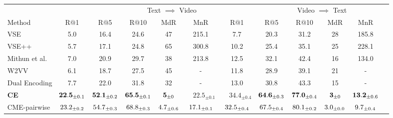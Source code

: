 \begin{table*}[t]
\centering 
\footnotesize 
\begin{tabular}{l | c | c c c c c |@{\hskip -0.2cm}c@{\hskip -0.35cm}c@{\hskip -0.35cm}c@{\hskip -0.1cm}c@{\hskip -0.2cm}c} 
\hline \hline
\multicolumn{2}{c}{} & 
\multicolumn{5}{c}{Text $\implies$ Video} & \multicolumn{5}{c}{Video $\implies$ Text} \\
Method  & R$@$1 & R$@$5 & R$@$10 & MdR & MnR & R$@$1 & R$@$5 & R$@$10 & MdR & MnR \\ 
\hline 
\hline 
VSE  & 5.0 & 16.4 & 24.6 & 47 & 215.1 & 7.7 & 20.3 & 31.2 & 28 & 185.8\\
VSE++ & 5.7 & 17.1 & 24.8 & 65 & 300.8 & 10.2 & 25.4 & 35.1 & 25 & 228.1 \\
Mithun et al. &  7.0 & 20.9 & 29.7 & 38 & 213.8  & 12.5 & 32.1 & 42.4 & 16 & 134.0 \\
W2VV & 6.1 & 18.7 & 27.5 & 45 & - &  11.8 & 28.9 & 39.1 & 21 & -  \\  
Dual Encoding & 7.7 & 22.0 & 31.8 & 32 & - &  13.0 & 30.8 & 43.3 & 15 & - \\
\textbf{CE}  & $ \mathbf{22.5}_{\pm0.1}$ & $ \mathbf{52.1}_{\pm0.2}$ & $ \mathbf{65.5}_{\pm0.1}$ & $ \mathbf{5}_{\pm0}$ & $\quad \mathbf{22.5}_{\pm0.1}$ & $\quad \mathbf{34.4}_{\pm0.4}$ & $ \mathbf{64.6}_{\pm0.3}$ & $ \mathbf{77.0}_{\pm0.4}$ & $ \mathbf{3}_{\pm0}$ & $ \mathbf{13.2}_{\pm0.6}$ \\
CME-pairwise & $ 23.2_{\pm0.2}$ & $ 54.7_{\pm0.3}$ & $ 68.8_{\pm0.3}$ & $ 4.7_{\pm0.6}$ & $ 17.1_{\pm0.1}$ & $ 32.5_{\pm0.4}$ & $ 67.5_{\pm0.4}$ & $ 80.1_{\pm0.2}$ & $ 3.0_{\pm0.0}$ & $ 9.7_{\pm0.4}$ \\

\end{tabular}
\end{table*}
